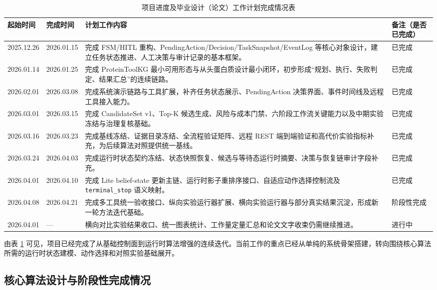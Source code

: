 \begin{table}[htbp]
	\centering
	\caption{项目进度及毕业设计（论文）工作计划完成情况表}
	\label{tab:midterm-plan-progress}
	\renewcommand{\arraystretch}{1.22}
	\fontsize{9.2pt}{12.8pt}\selectfont
	\begin{tabularx}{\textwidth}{p{2.1cm}p{2.1cm}>{\raggedright\arraybackslash}X p{2.5cm}}
		\toprule
		起始时间 & 完成时间 & 计划工作内容 & 备注（是否已完成） \\
		\midrule
		2025.12.26 & 2026.01.15 & 完成 FSM/HITL 重构、PendingAction/Decision/TaskSnapshot/EventLog 等核心对象设计，建立任务状态推进、人工决策与审计记录的基本框架。 & 已完成 \\
		2026.01.14 & 2026.01.25 & 完成 ProteinToolKG 最小可用形态与从头蛋白质设计最小闭环，初步形成“规划、执行、失败判定、结果汇总”的连续链路。 & 已完成 \\
		2026.02.01 & 2026.03.08 & 完成系统演示链路与工具扩展，补齐任务状态展示、PendingAction 决策界面、事件时间线及远程工具接入能力。 & 已完成 \\
		2026.03.01 & 2026.03.15 & 完成 CandidateSet v1、Top-K 候选生成、风险与成本门禁、六阶段工作流关键能力以及中期实验冻结与治理复核基础。 & 已完成 \\
		2026.03.16 & 2026.03.23 & 完成基线冻结、证据目录冻结、全流程验证矩阵、远程 REST 端到端验证和高代价实验指标补充，为后续算法对照提供统一基线。 & 已完成 \\
		2026.03.24 & 2026.04.03 & 完成运行时状态契约冻结、状态快照恢复、候选与等待态运行时摘要、决策与恢复链审计字段补充。 & 已完成 \\
		2026.04.01 & 2026.04.10 & 完成 Lite belief-state 更新主链、运行时影子重排序接口、自适应动作选择控制流及 \texttt{terminal\_stop} 语义映射。 & 已完成 \\
		2026.04.08 & 2026.04.21 & 完成多工具统一验收接口、纵向实验运行器扩展、横向实验运行器与部分真实结果沉淀，形成新一轮方法迭代基础。 & 阶段性完成 \\
		2026.04.01 & --- & 横向对比实验结果收口、统一图表统计、工作量定量汇总和论文文字收束仍需继续推进。 & 进行中 \\
		\bottomrule
	\end{tabularx}
\end{table}

\normalsize
由表 \ref{tab:midterm-plan-progress} 可见，项目已经完成了从基础控制面到运行时算法增强的连续迭代。当前工作的重点已经从单纯的系统骨架搭建，转向围绕核心算法所需的运行时状态建模、动作选择和对照实验基础展开。

\subsection{核心算法设计与阶段性完成情况}

